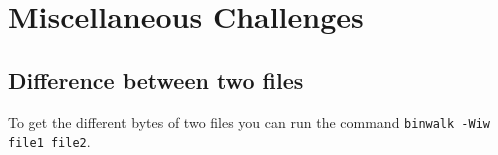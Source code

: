 
\section{Miscellaneous Challenges}

\subsection{Difference between two files}
To get the different bytes of two files you can run the command \lstinline|binwalk -Wiw file1 file2|. 